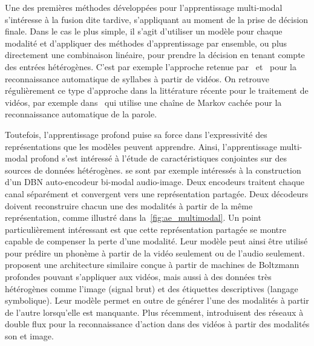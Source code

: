 Une des premières méthodes développées pour l'apprentissage multi-modal s'intéresse à la fusion dite tardive, s'appliquant au moment de la prise de décision finale. Dans le cas le plus simple, il s'agit d'utiliser un modèle pour chaque modalité et d'appliquer des méthodes d'apprentissage par ensemble, ou plus directement une combinaison linéaire, pour prendre la décision en tenant compte des entrées hétérogènes. C'est par exemple l'approche retenue par~\citet{yuhas_integration_1989} et~\citet{meier_adaptive_1996} pour la reconnaissance automatique de syllabes à partir de vidéos. On retrouve régulièrement ce type d'approche dans la littérature récente pour le traitement de vidéos, par exemple dans~\cite{noda_audio-visual_2015} qui utilise une chaîne de Markov cachée pour la reconnaissance automatique de la parole.

Toutefois, l'apprentissage profond puise sa force dans l'expressivité des représentations que les modèles peuvent apprendre. Ainsi, l'apprentissage multi-modal profond s'est intéressé à l'étude de caractéristiques conjointes sur des sources de données hétérogènes. \citet{ngiam_multimodal_2011} se sont par exemple intéressés à la construction d'un \gls{DBN} auto-encodeur bi-modal audio-image. Deux encodeurs traitent chaque canal séparément et convergent vers une représentation partagée. Deux décodeurs doivent reconstruire chacun une des modalités à partir de la même représentation, comme illustré dans la~\cref{fig:ae_multimodal}. Un point particulièrement intéressant est que cette représentation partagée se montre capable de compenser la perte d'une modalité. Leur modèle peut ainsi être utilisé pour prédire un phonème à partir de la vidéo seulement ou de l'audio seulement.
\cite{srivastava_multimodal_2014} proposent une architecture similaire conçue à partir de machines de Boltzmann profondes pouvant s'appliquer aux vidéos, mais aussi à des données très hétérogènes comme l'image (signal brut) et des étiquettes descriptives (langage symbolique). Leur modèle permet en outre de générer l'une des modalités à partir de l'autre lorsqu'elle est manquante. Plus récemment, \citet{simonyan_two-stream_2014} introduisent des réseaux à double flux pour la reconnaissance d'action dans des vidéos à partir des modalités son et image.

